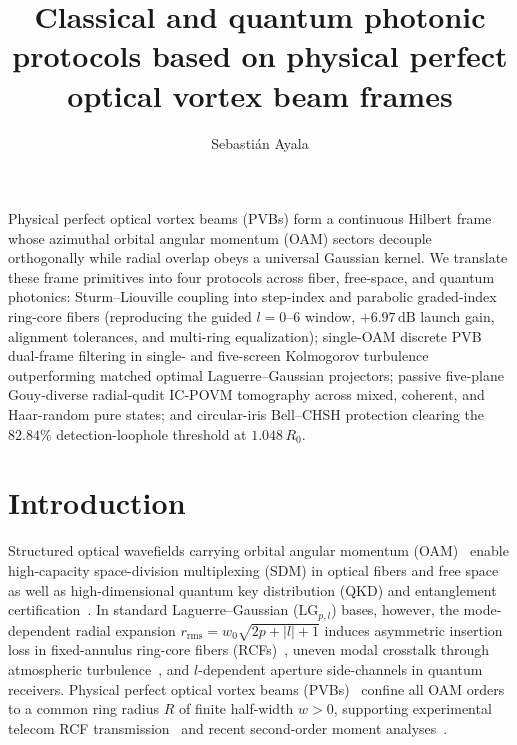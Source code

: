 \documentclass{optica-article}
\newcommand{\abs}[1]{\lvert #1 \rvert}
\begin{document}
\title{Classical and quantum photonic protocols based on physical perfect optical vortex beam frames}

\author{Sebasti\'an Ayala\authormark{*}}

\address{Independent Researcher, Cauquenes, Chile\\
ORCID: \href{https://orcid.org/0009-0003-7348-3883}{0009-0003-7348-3883}}


\begin{abstract*}
Physical perfect optical vortex beams (PVBs) form a continuous Hilbert frame whose azimuthal orbital angular momentum (OAM) sectors decouple orthogonally while radial overlap obeys a universal Gaussian kernel. We translate these frame primitives into four protocols across fiber, free-space, and quantum photonics: Sturm--Liouville coupling into step-index and parabolic graded-index ring-core fibers (reproducing the guided $l = 0\text{--}6$ window, $+6.97\,\mathrm{dB}$ launch gain, alignment tolerances, and multi-ring equalization); single-OAM discrete PVB dual-frame filtering in single- and five-screen Kolmogorov turbulence outperforming matched optimal Laguerre--Gaussian projectors; passive five-plane Gouy-diverse radial-qudit IC-POVM tomography across mixed, coherent, and Haar-random pure states; and circular-iris Bell--CHSH protection clearing the $82.84\%$ detection-loophole threshold at $1.048\,R_0$.
\end{abstract*}

\section{Introduction}
\label{sec:intro}

Structured optical wavefields carrying orbital angular momentum (OAM)~\cite{Allen1992,Erhard2018} enable high-capacity space-division multiplexing (SDM) in optical fibers and free space~\cite{Bozinovic2013,Willner2015} as well as high-dimensional quantum key distribution (QKD) and entanglement certification~\cite{Mirhosseini2015,Walborn2010}. In standard Laguerre--Gaussian ($\mathrm{LG}_{p,l}$) bases, however, the mode-dependent radial expansion $r_{\mathrm{rms}} = w_0\sqrt{2p+\abs{l}+1}$ induces asymmetric insertion loss in fixed-annulus ring-core fibers (RCFs)~\cite{Ramachandran2009,Zhang2018GRIN,RojasRojas2021,Canas2021,Asgharzadeh2026}, uneven modal crosstalk through atmospheric turbulence~\cite{Paterson2005,TylerBoyd2009,Roux2011,Ibrahim2013}, and $l$-dependent aperture side-channels in quantum receivers. Physical perfect optical vortex beams (PVBs)~\cite{Ostrovsky2013,Vaity2015,Reddy2016} confine all OAM orders to a common ring radius $R$ of finite half-width $w > 0$, supporting experimental telecom RCF transmission~\cite{Villalba2023} and recent second-order moment analyses~\cite{Ferreira2026}.
\end{document}
